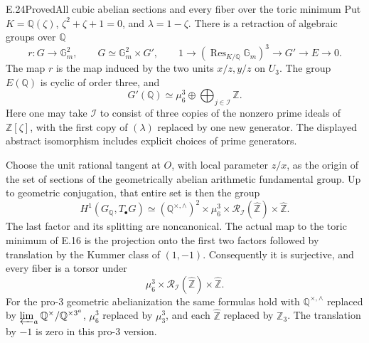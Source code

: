 \begin{statement}{E.24}{Proved}{All cubic abelian sections and every fiber over the toric minimum}
Put $K=\mathbb Q(\zeta)$, $\zeta^2+\zeta+1=0$,
and $\lambda=1-\zeta$. There is a retraction of algebraic groups
over $\mathbb Q$
\[
 r:G\longrightarrow\mathbb G_m^2,\qquad
 G\simeq\mathbb G_m^2\times G',
 \qquad
 1\longrightarrow(\operatorname{Res}_{K/\mathbb Q}\mathbb G_m)^3
 \longrightarrow G'\longrightarrow E\longrightarrow0.
\]
The map $r$ is the map induced by the two units $x/z,y/z$ on $U_3$.
The group $E(\mathbb Q)$ is cyclic of order three, and
\[
 G'(\mathbb Q)\simeq\mu_6^3\oplus
                  \bigoplus_{j\in\mathcal I}\mathbb Z .
\]
Here one may take $\mathcal I$ to consist of three copies of the
nonzero prime ideals of $\mathbb Z[\zeta]$, with the first copy of
$(\lambda)$ replaced by one new generator. The displayed abstract
isomorphism includes explicit choices of prime generators.

Choose the unit rational tangent at $O$, with local parameter $z/x$,
as the origin of the set of sections of the geometrically abelian
arithmetic fundamental group. Up to geometric conjugation, that
entire set is then the group
\[
 H^1(G_{\mathbb Q},T_\bullet G)
 \simeq
 (\mathbb Q^{\times,\wedge})^2
 \times\mu_6^3
 \times\mathcal R_{\mathcal I}(\widehat{\mathbb Z})
 \times\widehat{\mathbb Z}.
 \tag{E24.1}
\]
The last factor and its splitting are noncanonical. The actual map
to the toric minimum of E.16 is the projection onto the first two
factors followed by translation by the Kummer class of $(1,-1)$.
Consequently it is surjective, and every fiber is a torsor under
\[
 \mu_6^3\times
 \mathcal R_{\mathcal I}(\widehat{\mathbb Z})\times\widehat{\mathbb Z}.
 \tag{E24.2}
\]
For the pro-$3$ geometric abelianization the same formulas hold
with $\mathbb Q^{\times,\wedge}$ replaced by
$\varprojlim_a\mathbb Q^\times/\mathbb Q^{\times3^a}$,
$\mu_6^3$ replaced by $\mu_3^3$, and each
$\widehat{\mathbb Z}$ replaced by $\mathbb Z_3$.
The translation by $-1$ is zero in this pro-$3$ version.
\end{statement}
